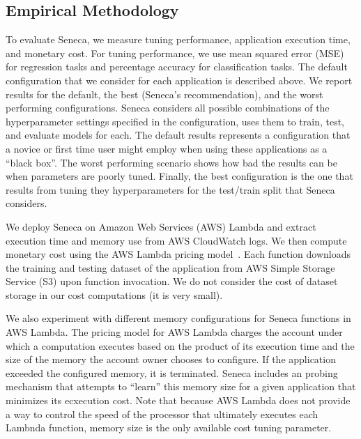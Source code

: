 \subsection{Empirical Methodology}

To evaluate Seneca, we measure tuning performance, application execution time,
and monetary cost.  For tuning performance, we use mean squared error (MSE)
for regression tasks and percentage accuracy for classification tasks. The
default configuration that we consider for each application is described
above.  We report results for the default, the best (Seneca's recommendation),
and the worst performing configurations.  Seneca considers all possible
combinations of the hyperparameter settings specified in the configuration,
uses them to train, test, and evaluate models for each.  The default results
represents a configuration that a novice or first time user might employ when
using these applications as a ``black box''.  The worst performing scenario
shows how bad the results can be when parameters are poorly tuned.  Finally,
the best configuration is the one that results from tuning they
hyperparameters for the test/train split that Seneca considers.  

We deploy Seneca on Amazon Web Services (AWS) Lambda and extract execution
time and memory use from AWS CloudWatch logs.  We then compute monetary cost
using the AWS Lambda pricing model~\cite{ref:pricing}.
Each function downloads the training and testing dataset of the application
from AWS Simple Storage Service (S3) upon function invocation.  We do not
consider the cost of dataset storage in our cost computations (it is very
small).

We also experiment with different memory configurations for Seneca functions
in AWS Lambda.  The pricing model for AWS Lambda charges the account under
which a computation executes based on the product of its execution time and
the size of the memory the account owner chooses to configure.  If the
application exceeded the configured memory, it is terminated.  
Seneca includes an probing
mechanism that attempts to ``learn'' this memory size for a given
application that minimizes its ecxecution cost.  Note that because AWS Lambda
does not provide a way to control the speed of the processor that ultimately
executes each Lambnda function, memory size is the only available cost tuning
parameter.

